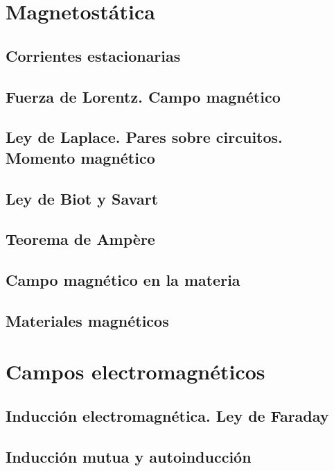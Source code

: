 \documentclass[a4paper]{book}
\begin{document}
\chapter{Magnetostática}


\section{Corrientes estacionarias}

\section{Fuerza de Lorentz. Campo magnético}

\section{ Ley de Laplace. Pares sobre circuitos. Momento magnético}

\section{Ley de Biot y Savart}

\section{Teorema de Ampère}

\section{Campo magnético en la materia}

\section{Materiales magnéticos}




\chapter{Campos electromagnéticos}

\section{Inducción electromagnética. Ley de Faraday}

\section{Inducción mutua y autoinducción}
\end{document}
